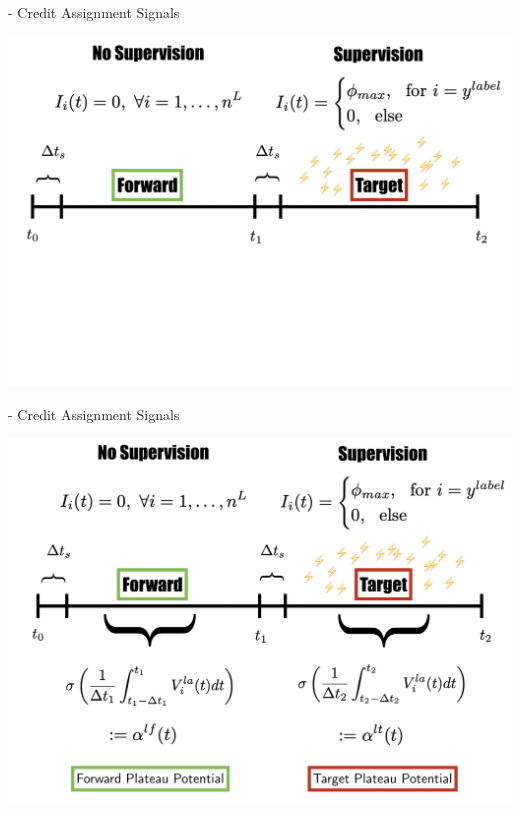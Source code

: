 \documentclass[dvipsnames, usenames]{beamer}
\begin{document}
\begin{frame}{\citet{guerguiev2017} - Credit Assignment Signals}

\centering 
\includegraphics[width=1.05\textwidth]{../figures/report/phases_1}
         
\end{frame}
\begin{frame}[noframenumbering]{\citet{guerguiev2017} - Credit Assignment Signals}

\centering 
\includegraphics[width=1.05\textwidth]{../figures/report/phases_2}         

\end{frame}
\end{document}

